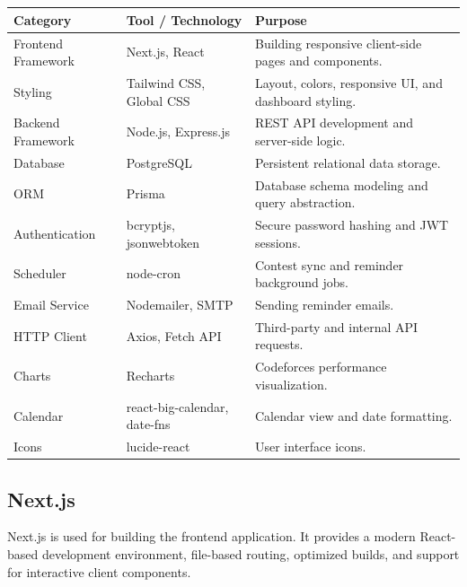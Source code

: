 \documentclass[12pt,a4paper]{report}
\begin{document}
\chapter{}
\begin{normalsize}

\begin{center}
\begin{tabular}{|p{3.8cm}|p{4.2cm}|p{6cm}|}
\hline
\textbf{Category} & \textbf{Tool / Technology} & \textbf{Purpose} \\
\hline
Frontend Framework & Next.js, React & Building responsive client-side pages and components. \\
\hline
Styling & Tailwind CSS, Global CSS & Layout, colors, responsive UI, and dashboard styling. \\
\hline
Backend Framework & Node.js, Express.js & REST API development and server-side logic. \\
\hline
Database & PostgreSQL & Persistent relational data storage. \\
\hline
ORM & Prisma & Database schema modeling and query abstraction. \\
\hline
Authentication & bcryptjs, jsonwebtoken & Secure password hashing and JWT sessions. \\
\hline
Scheduler & node-cron & Contest sync and reminder background jobs. \\
\hline
Email Service & Nodemailer, SMTP & Sending reminder emails. \\
\hline
HTTP Client & Axios, Fetch API & Third-party and internal API requests. \\
\hline
Charts & Recharts & Codeforces performance visualization. \\
\hline
Calendar & react-big-calendar, date-fns & Calendar view and date formatting. \\
\hline
Icons & lucide-react & User interface icons. \\
\hline
\end{tabular}
\end{center}

\section{Next.js}

Next.js is used for building the frontend application. It provides a modern React-based development environment, file-based routing, optimized builds, and support for interactive client components.


\end{normalsize}
\end{document}
